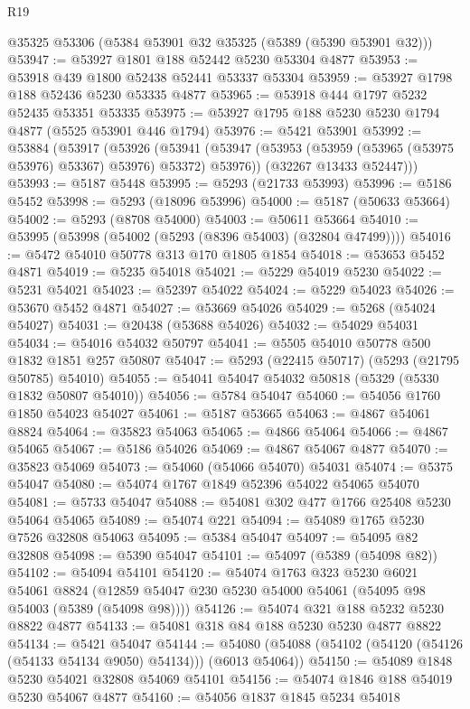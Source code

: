 \begin{lexlean}{R19}
\begin{coremodule}
    @35325
    @53306
    (@5384 @53901 @32 @35325 (@5389 (@5390 @53901 @32)))
@53947 := @53927 @1801 @188 @52442 @5230 @53304 @4877
@53953 := @53918 @439 @1800 @52438 @52441 @53337 @53304
@53959 := @53927 @1798 @188 @52436 @5230 @53335 @4877
@53965 := @53918 @444 @1797 @5232 @52435 @53351 @53335
@53975 := @53927 @1795 @188 @5230 @5230 @1794 @4877 (@5525 @53901 @446 @1794)
@53976 := @5421 @53901
@53992 := @53884
    (@53917
      (@53926
        (@53941 (@53947 (@53953 (@53959 (@53965 (@53975 @53976) @53367) @53976) @53372) @53976))
        (@32267 @13433 @52447)))
@53993 := @5187 @5448
@53995 := @5293 (@21733 @53993)
@53996 := @5186 @5452
@53998 := @5293 (@18096 @53996)
@54000 := @5187 (@50633 @53664)
@54002 := @5293 (@8708 @54000)
@54003 := @50611 @53664
@54010 := @53995 (@53998 (@54002 (@5293 (@8396 @54003) (@32804 @47499))))
@54016 := @5472 @54010 @50778 @313 @170 @1805 @1854
@54018 := @53653 @5452 @4871
@54019 := @5235 @54018
@54021 := @5229 @54019 @5230
@54022 := @5231 @54021
@54023 := @52397 @54022
@54024 := @5229 @54023
@54026 := @53670 @5452 @4871
@54027 := @53669 @54026
@54029 := @5268 (@54024 @54027)
@54031 := @20438 (@53688 @54026)
@54032 := @54029 @54031
@54034 := @54016 @54032 @50797
@54041 := @5505 @54010 @50778 @500 @1832 @1851 @257 @50807
@54047 := @5293 (@22415 @50717) (@5293 (@21795 @50785) @54010)
@54055 := @54041 @54047 @54032 @50818 (@5329 (@5330 @1832 @50807 @54010))
@54056 := @5784 @54047
@54060 := @54056 @1760 @1850 @54023 @54027
@54061 := @5187 @53665
@54063 := @4867 @54061 @8824
@54064 := @35823 @54063
@54065 := @4866 @54064
@54066 := @4867 @54065
@54067 := @5186 @54026
@54069 := @4867 @54067 @4877
@54070 := @35823 @54069
@54073 := @54060 (@54066 @54070) @54031
@54074 := @5375 @54047
@54080 := @54074 @1767 @1849 @52396 @54022 @54065 @54070
@54081 := @5733 @54047
@54088 := @54081 @302 @477 @1766 @25408 @5230 @54064 @54065
@54089 := @54074 @221
@54094 := @54089 @1765 @5230 @7526 @32808 @54063
@54095 := @5384 @54047
@54097 := @54095 @82 @32808
@54098 := @5390 @54047
@54101 := @54097 (@5389 (@54098 @82))
@54102 := @54094 @54101
@54120 := @54074
    @1763
    @323
    @5230
    @6021
    @54061
    @8824
    (@12859 @54047 @230 @5230 @54000 @54061 (@54095 @98 @54003 (@5389 (@54098 @98))))
@54126 := @54074 @321 @188 @5232 @5230 @8822 @4877
@54133 := @54081 @318 @84 @188 @5230 @5230 @4877 @8822
@54134 := @5421 @54047
@54144 := @54080 (@54088 (@54102 (@54120 (@54126 (@54133 @54134 @9050) @54134))) (@6013 @54064))
@54150 := @54089 @1848 @5230 @54021 @32808 @54069 @54101
@54156 := @54074 @1846 @188 @54019 @5230 @54067 @4877
@54160 := @54056 @1837 @1845 @5234 @54018

\end{coremodule}
\end{lexlean}
